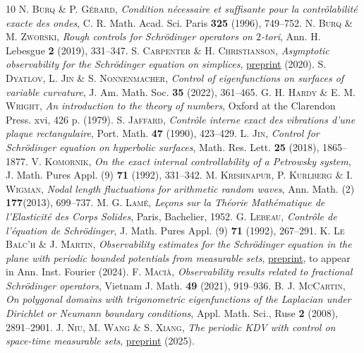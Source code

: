 \documentclass[a4paper,11pt]{amsart}
\numberwithin{equation}{section}
\theoremstyle{definition}
\begin{document}
\begin{thebibliography}{10}
     N. \textsc{Burq} \& P. \textsc{G\'erard}, \textit{Condition n\'ecessaire et suffisante pour la contr\^olabilit\'e exacte des ondes}, C. R. Math. Acad. Sci. Paris \textbf{325} (1996), 749--752.
	 N. \textsc{Burq} \& M. \textsc{Zworski}, \textit{Rough controls for Schr\"odinger operators on $2$-tori}, Ann. H. Lebesgue \textbf{2} (2019), 331--347.
	 S. \textsc{Carpenter} \& H. \textsc{Christianson}, \textit{Asymptotic observability for the Schr\"odinger equation on simplices}, \href{https://arxiv.org/abs/2005.11287}{preprint} (2020).
	 S. \textsc{Dyatlov}, L. \textsc{Jin} \& S. \textsc{Nonnenmacher}, \textit{Control of eigenfunctions on surfaces of variable curvature}, J. Am. Math. Soc. \textbf{35} (2022), 361--465.
	 G. H. \textsc{Hardy} \& E. M. \textsc{Wright}, \textit{An introduction to the theory of numbers}, {Oxford} at the {Clarendon} {Press}. xvi, 426 p. (1979).
	 S. \textsc{Jaffard}, \textit{Contr\^ole interne exact des vibrations d'une plaque rectangulaire}, Port. Math. \textbf{47} (1990), 423--429.
	 L. \textsc{Jin}, \textit{Control for Schr\"odinger equation on hyperbolic surfaces}, Math. Res. Lett. \textbf{25} (2018), 1865--1877.
	 V. \textsc{Komornik}, \textit{On the exact internal controllability of a Petrowsky system}, J. Math. Pures Appl. (9) \textbf{71} (1992), 331--342.
	 M. \textsc{Krishnapur}, P. \textsc{Kurlberg} \& I. \textsc{Wigman}, \textit{Nodal length fluctuations for arithmetic random waves}, Ann. Math. (2) \textbf{177}(2013), 699--737.
	 M. G. \textsc{Lam\'e}, \textit{Le\c{c}ons sur la Th\'eorie Math\'ematique de l'Elasticit\'e des Corps Solides}, Paris, Bachelier, 1952.
	 G. \textsc{Lebeau}, \textit{Contr\^ole de l'\'equation de Schr\"odinger}, J. Math. Pures Appl. (9) \textbf{71} (1992), 267--291.
	 K. \textsc{Le Balc'h} \& J. \textsc{Martin}, \textit{Observability estimates for the Schr\"odinger equation in the plane with periodic bounded potentials from measurable sets}, \href{https://arxiv.org/abs/2304.08050}{preprint}, to appear in Ann. Inst. Fourier (2024).
	 F. \textsc{Maci\`a}, \textit{Observability results related to fractional Schr\"odinger operators}, Vietnam J. Math. \textbf{49} (2021), 919--936.
	 B. J. \textsc{McCartin}, \textit{On polygonal domains with trigonometric eigenfunctions of the {Laplacian} under Dirichlet or Neumann boundary conditions}, Appl. Math. Sci., Ruse \textbf{2} (2008), 2891--2901.
	 J. \textsc{Niu}, M. \textsc{Wang} \& S. \textsc{Xiang}, \textit{The periodic KDV with control on space-time measurable sets}, \href{https://arxiv.org/abs/2507.13740}{preprint} (2025).

\end{thebibliography}
\end{document}
